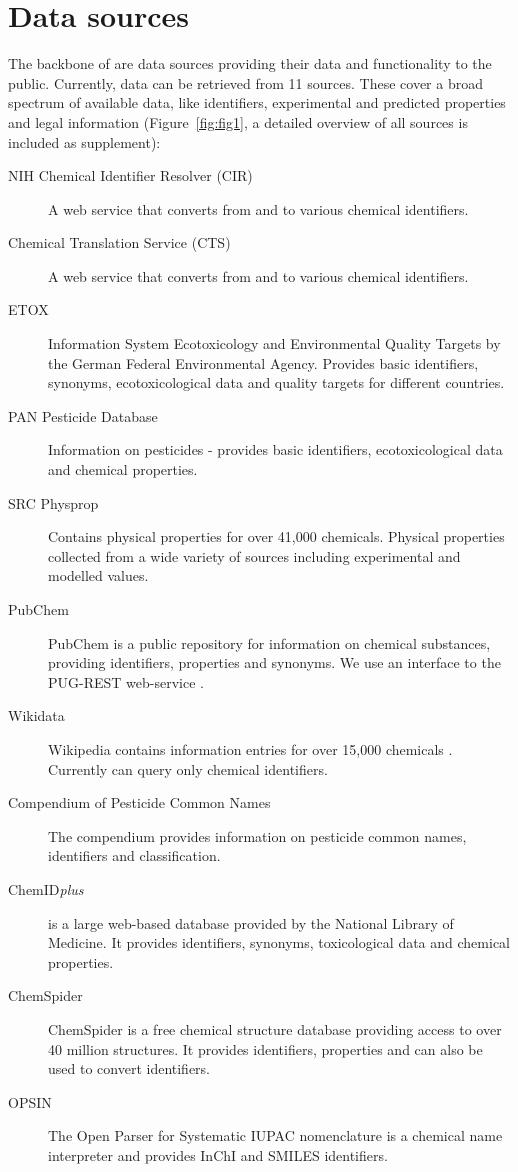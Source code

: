 \documentclass[article, shortnames]{jss}\usepackage[]{graphicx}\usepackage[]{color}
\begin{document}
\section[Data sources]{Data sources}
The backbone of  are data sources providing their data and functionality to the public.
Currently, data can be retrieved from 11 sources.
These cover a broad spectrum of available data, like identifiers, experimental and predicted properties and legal information (Figure~\ref{fig:fig1}, a detailed overview of all sources is included as supplement):

\begin{description}
  \item[NIH Chemical Identifier Resolver (CIR) \citep{cir}]{A web service that converts from and to various chemical identifiers.}
  \item[Chemical Translation Service (CTS) \citep{Wohlgemuth_Haldiya_Willighagen_Kind_Fiehn_2010}]{A web service that converts from and to various chemical identifiers.}
  \item[ETOX \citep{etox}]{Information System Ecotoxicology and Environmental Quality Targets by the German Federal Environmental Agency. Provides basic identifiers, synonyms, ecotoxicological data and quality targets for different countries.}
  \item[PAN Pesticide Database \citep{pan}]{Information on pesticides - provides basic identifiers, ecotoxicological data and chemical properties.}
  \item[SRC Physprop \citep{physprop}]{Contains physical properties for over 41,000 chemicals.
  Physical properties collected from a wide variety of sources including experimental and modelled values.}
  \item[PubChem \citep{Kim_2016}]{PubChem is a public repository for information on chemical substances, providing identifiers, properties and synonyms.
  We use an interface to the PUG-REST web-service \citep{Kim_Thiessen_Bolton_Bryant_2015}.}
  \item[Wikidata \citep{wiki}]{Wikipedia contains information entries for over 15,000 chemicals \citep{Ertl_Patiny_Sander_Rufener_Zasso_2015}. Currently  can query only chemical identifiers.}
  \item[Compendium of Pesticide Common Names \citep{wood}]{The compendium provides information on pesticide common names, identifiers and classification.}
  \item[ChemID\emph{plus} \citep{Tomasulo_2002}]{is a large web-based database provided by the National Library of Medicine. It provides identifiers, synonyms, toxicological data and chemical properties.}
  \item[ChemSpider \citep{pence_chemspider:_2010}]{ChemSpider is a free chemical structure database providing access to over 40 million structures. It provides identifiers, properties and can also be used to convert identifiers.}
  \item[OPSIN  \citep{Lowe_Corbett_Murray-Rust_Glen_2011}]{The Open Parser for Systematic IUPAC nomenclature is a chemical name interpreter and provides InChI and SMILES identifiers.}
\end{description}
\end{document}
